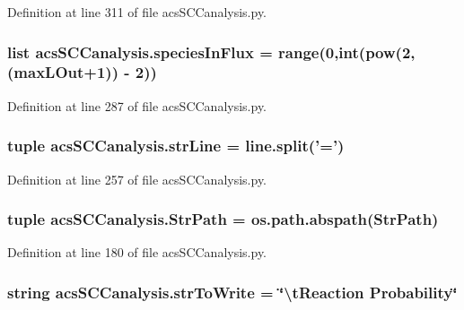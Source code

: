 Definition at line 311 of file acs\-S\-C\-Canalysis.\-py.

\hypertarget{a00097_a36f6b63269e716f42cd38a36a781a4cf}{
\subsubsection[{species\-In\-Flux}]{\setlength{\rightskip}{0pt plus 5cm}list acs\-S\-C\-Canalysis.\-species\-In\-Flux = range(0,int(pow(2,({\bf max\-L\-Out}+1)) -\/ 2))}}\label{a00097_a36f6b63269e716f42cd38a36a781a4cf}


Definition at line 287 of file acs\-S\-C\-Canalysis.\-py.

\hypertarget{a00097_a072631e11db72789389935b0f9efff8d}{
\subsubsection[{str\-Line}]{\setlength{\rightskip}{0pt plus 5cm}tuple acs\-S\-C\-Canalysis.\-str\-Line = {\bf line.\-split}('=')}}\label{a00097_a072631e11db72789389935b0f9efff8d}


Definition at line 257 of file acs\-S\-C\-Canalysis.\-py.

\hypertarget{a00097_af8add8b37a9c8a7825c0e8f0e7dfd6c1}{
\subsubsection[{Str\-Path}]{\setlength{\rightskip}{0pt plus 5cm}tuple acs\-S\-C\-Canalysis.\-Str\-Path = os.\-path.\-abspath(Str\-Path)}}\label{a00097_af8add8b37a9c8a7825c0e8f0e7dfd6c1}


Definition at line 180 of file acs\-S\-C\-Canalysis.\-py.

\hypertarget{a00097_a1966f0657c6b477eeb60bde732a201cc}{
\subsubsection[{str\-To\-Write}]{\setlength{\rightskip}{0pt plus 5cm}string acs\-S\-C\-Canalysis.\-str\-To\-Write = \char`\"{}\textbackslash{}t\-Reaction Probability\char`\"{}}}\label{a00097_a1966f0657c6b477eeb60bde732a201cc}


